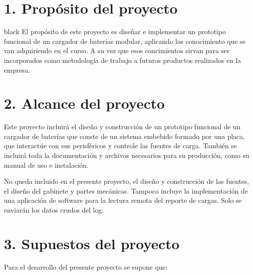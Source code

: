 \documentclass[11pt]{charter}
\begin{document}
\section{1. Propósito del proyecto}
\label{sec:proposito}

\begin{consigna}{black}
El propósito de este proyecto es diseñar e implementar un prototipo funcional de un cargador de baterías modular, aplicando los conocimiento que se van adquiriendo en el curso. A su vez que esos concimientos sirvan para ser incorporados como metodología de trabajo a futuros productos realizados en la empresa.
\end{consigna}

\section{2. Alcance del proyecto}
\label{sec:alcance}

Este proyecto incluirá el diseño y construcción de un prototipo funcional de un cargador de baterías que conste de un sistema embebido formado por una placa, que interactúe con sus perisféricos y controle las fuentes de carga. También  se incluirá toda la documentación y archivos necesarios para su producción, como su manual de uso e instalación.

No queda incluido en el presente proyecto, el diseño y construcción de las fuentes, el diseño del gabinete y partes mecánicas. Tampoco incluye la implementación de una aplicación de software para la lectura remota del reporte de cargas. Solo se enviarán los datos crudos del log.


\section{3. Supuestos del proyecto}
\label{sec:supuestos}

Para el desarrollo del presente proyecto se supone que: 
\end{document}
